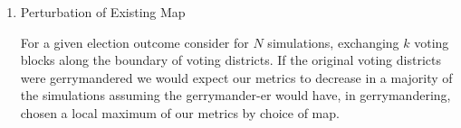 \documentclass[10pt]{article}
\theoremstyle{definition}
\theoremstyle{remark}
\begin{document}
\begin{enumerate}
\begin{enumerate}
        \item Perturbation of Existing Map

        For a given election outcome
        consider for $N$ simulations, exchanging $k$ voting blocks along the
        boundary of voting districts. If the original voting districts were
        gerrymandered we would expect our metrics to decrease in a majority of
        the simulations assuming the gerrymander-er would have, in
        gerrymandering, chosen a local maximum of our metrics by choice of map.

    \end{enumerate}
\end{enumerate}

\end{document}
